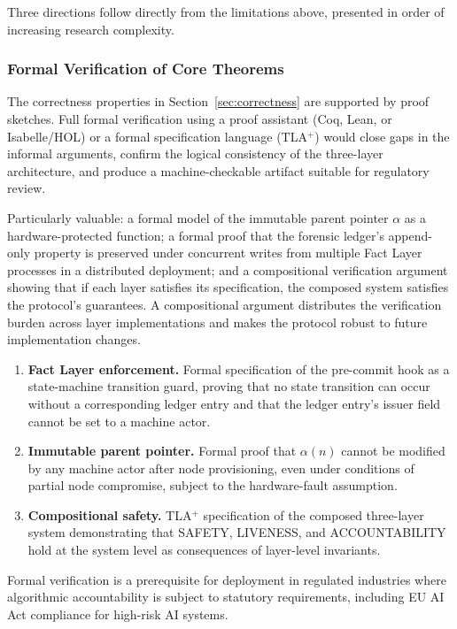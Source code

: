 Three directions follow directly from the limitations above, presented in order of increasing research complexity.

\subsubsection{Formal Verification of Core Theorems}
\label{sec:fw-formal-verification}

The correctness properties in Section~\ref{sec:correctness} are supported by proof sketches. Full formal verification using a proof assistant (Coq, Lean, or Isabelle/HOL) or a formal specification language (TLA$^+$) would close gaps in the informal arguments, confirm the logical consistency of the three-layer architecture, and produce a machine-checkable artifact suitable for regulatory review.

Particularly valuable: a formal model of the immutable parent pointer $\alpha$ as a hardware-protected function; a formal proof that the forensic ledger's append-only property is preserved under concurrent writes from multiple Fact Layer processes in a distributed deployment; and a compositional verification argument showing that if each layer satisfies its specification, the composed system satisfies the protocol's guarantees. A compositional argument distributes the verification burden across layer implementations and makes the protocol robust to future implementation changes.

\begin{enumerate}
  \item[(i)] \textbf{Fact Layer enforcement.} Formal specification of the pre-commit hook as a state-machine transition guard, proving that no state transition can occur without a corresponding ledger entry and that the ledger entry's issuer field cannot be set to a machine actor.
  \item[(ii)] \textbf{Immutable parent pointer.} Formal proof that $\alpha(n)$ cannot be modified by any machine actor after node provisioning, even under conditions of partial node compromise, subject to the hardware-fault assumption.
  \item[(iii)] \textbf{Compositional safety.} TLA$^+$ specification of the composed three-layer system demonstrating that SAFETY, LIVENESS, and ACCOUNTABILITY hold at the system level as consequences of layer-level invariants.
\end{enumerate}

Formal verification is a prerequisite for deployment in regulated industries where algorithmic accountability is subject to statutory requirements, including EU AI Act compliance for high-risk AI systems.

